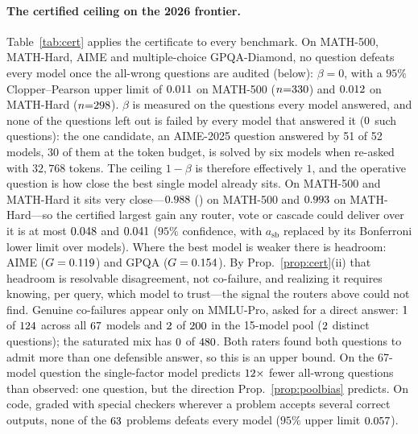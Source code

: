 \documentclass[11pt]{article}
\theoremstyle{plain}
\theoremstyle{definition}
\begin{document}
\paragraph{The certified ceiling on the 2026 frontier.} Table~\ref{tab:cert} applies the certificate to every benchmark. On
MATH-500, MATH-Hard, AIME and multiple-choice GPQA-Diamond, no question defeats every model once the all-wrong questions are
audited (below): $\beta=0$, with a $95\%$ Clopper--Pearson upper limit of $0.011$ on MATH-500 ($n{=}330$) and
$0.012$ on MATH-Hard ($n{=}298$). $\beta$ is measured on the questions every model answered, and none of the
questions left out is failed by every model that answered it ($0$ such questions): the one candidate, an AIME-2025
question answered by 51 of 52 models, 30 of them at the token budget, is solved by six models when re-asked with $32{,}768$
tokens. The ceiling $1-\beta$ is therefore effectively $1$, and the operative question is
how close the best single model already sits. On MATH-500 and MATH-Hard it sits very close---$0.988$ (\nMathSBName) on MATH-500 and
$0.993$ on MATH-Hard---so the certified largest gain any router, vote or cascade could deliver over it is at most
$0.048$ and $0.041$ ($95\%$ confidence, with $a_{\mathrm{sb}}$ replaced by its Bonferroni lower limit over models).
Where the best model is weaker there is headroom: AIME ($G=0.119$) and GPQA ($G=0.154$). By Prop.~\ref{prop:cert}(ii) that
headroom is resolvable disagreement, not co-failure, and realizing it requires knowing, per query, which model to trust---the
signal the routers above could not find. Genuine co-failures appear only on MMLU-Pro, asked for a direct answer:
$1$ of $124$ across all $67$ models and $2$ of $200$ in the 15-model pool ($2$ distinct
questions); the saturated mix has $0$ of $480$. Both raters found both questions to admit more than one defensible answer, so this is an upper bound. On the
67-model question the single-factor model predicts $12\times$ fewer all-wrong questions than observed: one
question, but the direction Prop.~\ref{prop:poolbias} predicts. On code, graded with special checkers wherever a problem accepts several correct outputs, none of the $63$
problems defeats every model ($95\%$ upper limit $0.057$).
\end{document}
